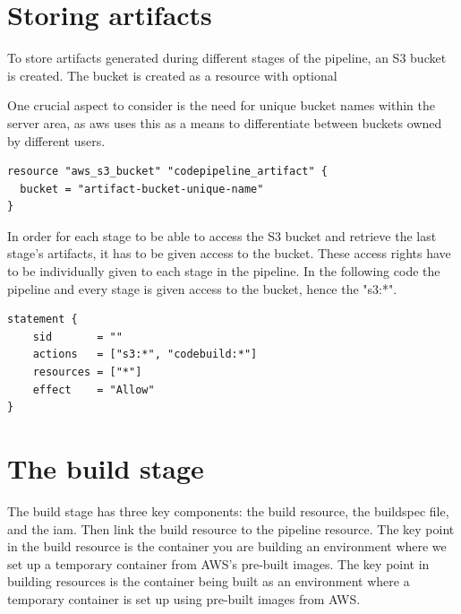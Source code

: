 \section{Storing artifacts}
To store \gls{artifact}s generated during different stages of the pipeline, an S3 bucket is created. The bucket is created as a resource with optional 

One crucial aspect to consider is the need for unique bucket names within the server area, as \acrshort{aws} uses this as a means to differentiate between buckets owned by different users.

\begin{tcolorbox}
\begin{verbatim}
resource "aws_s3_bucket" "codepipeline_artifact" {
  bucket = "artifact-bucket-unique-name"
}
\end{verbatim}
\end{tcolorbox}

In order for each stage to be able to access the S3 bucket and retrieve the last stage's \gls{artifact}s, it has to be given access to the bucket. These access rights have to be individually given to each stage in the pipeline. In the following code the pipeline and every stage is given access to the bucket, hence the "s3:*".

\begin{tcolorbox}
\begin{verbatim}
statement {
    sid       = ""
    actions   = ["s3:*", "codebuild:*"]
    resources = ["*"]
    effect    = "Allow"
}
\end{verbatim}
\end{tcolorbox}

\section{The build stage}
The build stage has three key components: the build resource, the \gls{buildspec} file, and the \acrshort{iam}. Then link the build resource to the pipeline resource. The key point in the build resource is the container you are building an environment where we set up a temporary container from AWS's pre-built images. The key point in building resources is the container being built as an environment where a temporary container is set up using pre-built images from AWS. 


